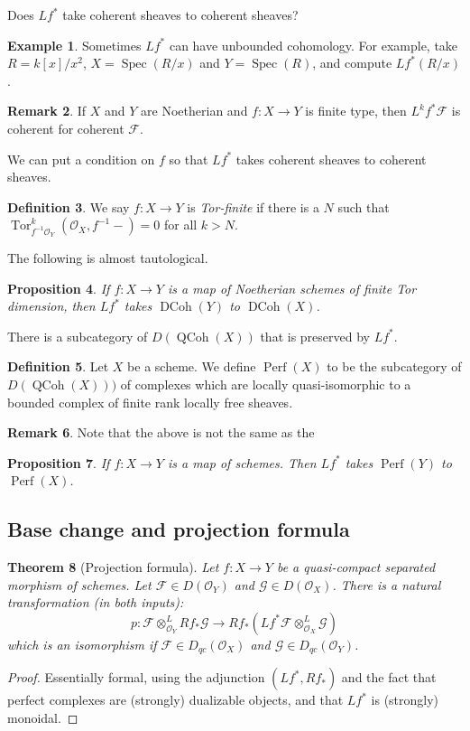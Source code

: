 \documentclass[10pt]{article}
\newtheorem{thm}{Theorem}[section]
\newtheorem{prop}[thm]{Proposition}
\theoremstyle{definition}
\newtheorem{exmp}[thm]{Example}
\newtheorem{defn}[thm]{Definition}
\newtheorem{rmk}[thm]{Remark}
\DeclareMathOperator{\Spec}{Spec}
\DeclareMathOperator{\Tor}{Tor}
\DeclareMathOperator{\QCoh}{QCoh}
\DeclareMathOperator{\DCoh}{DCoh}
\DeclareMathOperator{\Perf}{Perf}
\newcommand{\OO}{\mathcal{O}}
\begin{document}
Does $Lf^*$ take coherent sheaves to coherent sheaves?  
\begin{exmp}
Sometimes $Lf^*$ can have unbounded cohomology.  For example, take $R = k[x]/x^2$, $X = \Spec(R/x)$ and $Y = \Spec(R)$, and compute $Lf^*(R/x)$.
\end{exmp}
\begin{rmk}
If $X$ and $Y$ are Noetherian and $f: X \rightarrow Y$ is finite type, then $L^k f^* \mathcal{F}$ is coherent for coherent $\mathcal{F}$.
\end{rmk}

We can put a condition on $f$ so that $Lf^*$ takes coherent sheaves to coherent sheaves.
\begin{defn}
We say $f: X \rightarrow Y$ is \emph{Tor-finite} if there is a $N$ such that $\Tor_{f^{-1}\OO_Y}^k(\OO_X, f^{-1} -) = 0$ for all $k > N$.
\end{defn}

The following is almost tautological.
\begin{prop}
If $f: X \rightarrow Y$ is a map of Noetherian schemes of finite Tor dimension, then $Lf^*$ takes $\DCoh(Y)$ to $\DCoh(X)$.
\end{prop}

There is a subcategory of $D(\QCoh(X))$ that is preserved by $Lf^*$.
\begin{defn}
Let $X$ be a scheme.  We define $\Perf(X)$ to be the subcategory of $D(\QCoh(X)))$ of complexes which are locally quasi-isomorphic to a bounded complex of finite rank locally free sheaves.
\end{defn}

\begin{rmk}
Note that the above is not the same as the 
\end{rmk}

\begin{prop}
If $f: X \rightarrow Y$ is a map of schemes.  Then $Lf^*$ takes $\Perf(Y)$ to $\Perf(X)$.
\end{prop}



\subsection{Base change and projection formula}

\begin{thm}[Projection formula]
Let $f: X \rightarrow Y$ be a quasi-compact separated morphism of schemes.  Let $\mathcal{F} \in D(\OO_Y)$ and $\mathcal{G} \in D(\OO_X)$. There is a natural transformation (in both inputs):
$$p: \mathcal{F} \otimes^L_{\OO_Y} Rf_* \mathcal{G} \rightarrow Rf_*(Lf^* \mathcal{F} \otimes_{\OO_X}^L \mathcal{G})$$
which is an isomorphism if $\mathcal{F} \in D_{qc}(\OO_X)$ and $\mathcal{G} \in D_{qc}(\OO_Y)$.
\end{thm}
\begin{proof}
Essentially formal, using the adjunction $(Lf^*, Rf_*)$ and the fact that perfect complexes are (strongly) dualizable objects, and that $Lf^*$ is (strongly) monoidal.
\end{proof}
\end{document}
